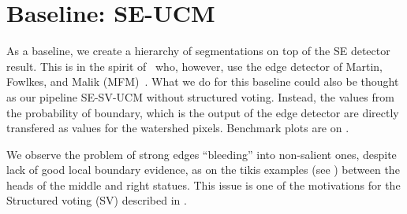 \section{Baseline: SE-UCM}
As a baseline, we create a hierarchy of segmentations on top of the SE detector result. This is in the spirit of~\cite{Arbelaez2006boundary} who, however, use the edge detector of Martin, Fowlkes, and Malik (MFM)~\cite{martin2004learning}. What we do for this baseline could also be thought as our pipeline SE-SV-UCM without structured voting. Instead, the values from the probability of boundary, which is the output of the edge detector are directly transfered as values for the watershed pixels. Benchmark plots are on .

We observe the problem of strong edges ``bleeding'' into non-salient ones, despite lack of good local boundary evidence, as on the tikis examples (see ) between the heads of the middle and right statues. This issue is one of the motivations for the Structured voting (SV) described in .%

